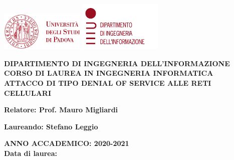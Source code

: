 \begin{titlepage}
  \begin{center}
    \includegraphics[width=0.3\textwidth]{images/unipd.png}
    \hfill
    \includegraphics[width=0.3\textwidth]{images/dei.png}
  \end{center}
  \begin{center}
    \vspace{3cm}
    \large
    \MakeUppercase{
      \textbf{
        Dipartimento di ingegneria dell'informazione\\
        \vspace{0.5cm}
        Corso di laurea in Ingegneria Informatica\\
      }
    }
    \vspace{5cm}
    \MakeUppercase{
      \textbf{
        Attacco di tipo Denial of Service alle reti cellulari\\
      }
    }
    \vspace{5cm}
    \begin{flushleft}
      \textbf{
        Relatore: Prof. Mauro Migliardi\\
      }
    \end{flushleft}
    \vspace{1cm}
    \begin{flushright}
      \textbf{
        Laureando: Stefano Leggio\\
      }
    \end{flushright}
    \vspace{1.5cm}
    \MakeUppercase{
      \textbf{
        Anno accademico: 2020-2021\\
      }
    }
    \vspace{0.5cm}
    \textbf{
      Data di laurea:
    }
  \end{center}

\end{titlepage}